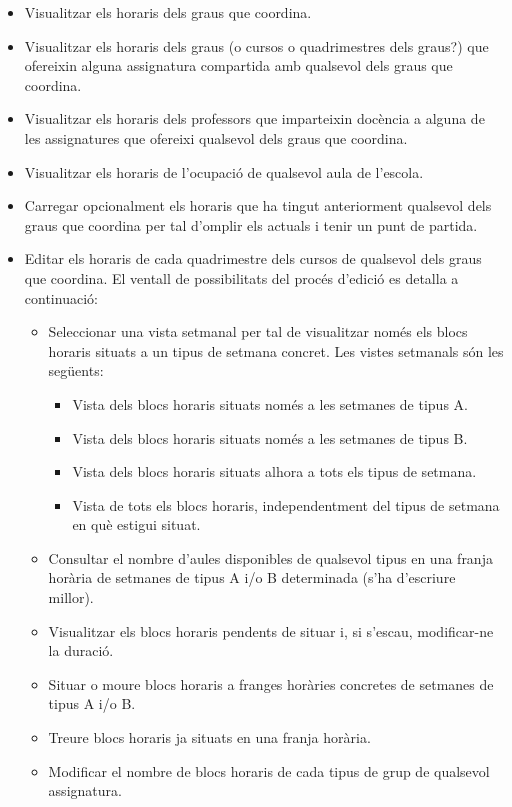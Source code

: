 \documentclass[a4paper,12pt]{ThesisStyle}
\begin{document}
\begin{itemize}
  \item Visualitzar els horaris dels graus que coordina.
  \item Visualitzar els horaris dels graus (o cursos o quadrimestres dels graus?) que ofereixin alguna assignatura compartida amb qualsevol dels graus que coordina.
  \item Visualitzar els horaris dels professors que imparteixin docència a alguna de les assignatures que ofereixi qualsevol dels graus que coordina.
  \item Visualitzar els horaris de l'ocupació de qualsevol aula de l'escola.
  \item Carregar opcionalment els horaris que ha tingut anteriorment qualsevol dels graus que coordina per tal d'omplir els actuals i tenir un punt de partida.
  \item Editar els horaris de cada quadrimestre dels cursos de qualsevol dels graus que coordina. El ventall de possibilitats del procés d'edició es detalla a continuació:
    \begin{itemize}
      \item Seleccionar una vista setmanal per tal de visualitzar només els blocs horaris situats a un tipus de setmana concret. Les vistes setmanals són les següents:
        \begin{itemize}
          \item Vista dels blocs horaris situats només a les setmanes de tipus A.
          \item Vista dels blocs horaris situats només a les setmanes de tipus B.
          \item Vista dels blocs horaris situats alhora a tots els tipus de setmana.
          \item Vista de tots els blocs horaris, independentment del tipus de setmana en què estigui situat.
        \end{itemize}
      \item Consultar el nombre d'aules disponibles de qualsevol tipus en una franja horària de setmanes de tipus A i/o B determinada (s'ha d'escriure millor).
      \item Visualitzar els blocs horaris pendents de situar i, si s'escau, modificar-ne la duració.
      \item Situar o moure blocs horaris a franges horàries concretes de setmanes de tipus A i/o B.
      \item Treure blocs horaris ja situats en una franja horària.
      \item Modificar el nombre de blocs horaris de cada tipus de grup de qualsevol assignatura.

\end{itemize}
\end{itemize}
\end{document}
